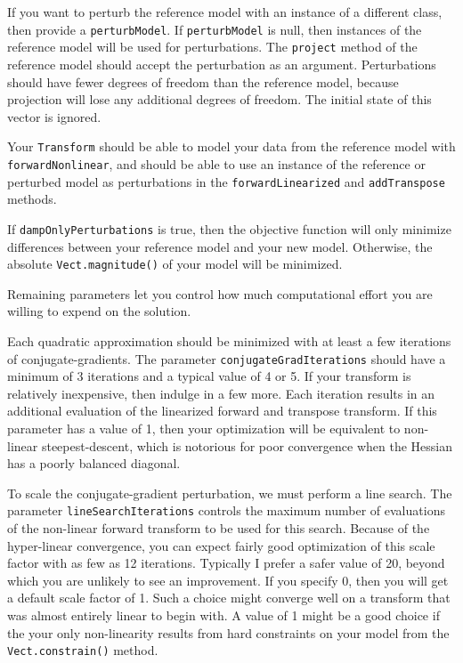 \documentclass[12pt]{article}
\begin{document}
If you want to perturb the reference model
with an instance of a different class, then
provide a \texttt{perturbModel}.  If
\texttt{perturbModel} is null, then instances
of the reference model will be used for
perturbations.  The \texttt{project} method
of the reference model should accept the
perturbation as an argument.  Perturbations
should have fewer degrees of freedom than the
reference model, because projection will lose
any additional degrees of freedom.  The
initial state of this vector is ignored.

Your \texttt{Transform} should be able to
model your data from the reference model with
\texttt{forwardNonlinear}, and should be able
to use an instance of the reference or
perturbed model as perturbations in the
\texttt{forwardLinearized} and
\texttt{addTranspose} methods.

If \texttt{dampOnlyPerturbations} is true,
then the objective function will only
minimize differences between your reference
model and your new model.  Otherwise, the
absolute \texttt{Vect.magnitude()} of your
model will be minimized.

Remaining parameters let you control how much
computational effort you are willing to
expend on the solution.

Each quadratic approximation should be
minimized with at least a few iterations of
conjugate-gradients.  The parameter
\texttt{conjugateGradIterations} should have
a minimum of 3 iterations and a typical value
of 4 or 5.  If your transform is relatively
inexpensive, then indulge in a few more.
Each iteration results in an additional
evaluation of the linearized forward and
transpose transform.  If this parameter has a
value of 1, then your optimization will be
equivalent to non-linear steepest-descent,
which is notorious for poor convergence when
the Hessian has a poorly balanced diagonal.

To scale the conjugate-gradient perturbation,
we must perform a line search.  The parameter
\texttt{lineSearchIterations} controls the
maximum number of evaluations of the
non-linear forward transform to be used for
this search.  Because of the hyper-linear
convergence, you can expect fairly good
optimization of this scale factor with as few
as 12 iterations.  Typically I prefer a safer
value of 20, beyond which you are unlikely to
see an improvement.  If you specify 0, then
you will get a default scale factor of 1.
Such a choice might converge well on a
transform that was almost entirely linear to
begin with.  A value of 1 might be a good
choice if the your only non-linearity results
from hard constraints on your model from the
\texttt{Vect.constrain()} method.
\end{document}
